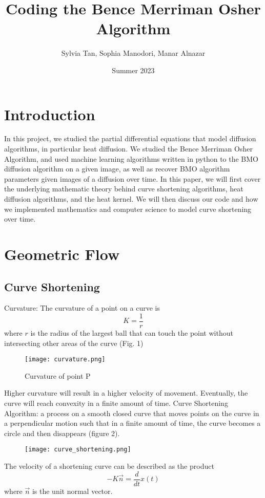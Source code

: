 \documentclass[12pt]{article}
\theoremstyle{plain}
\theoremstyle{definition}
\theoremstyle{remark}
\begin{document}
\title{Coding the Bence Merriman Osher Algorithm}
\author{Sylvia Tan, Sophia Manodori, Manar Alnazar}
\date{Summer 2023} %

\maketitle
\tableofcontents
\section{Introduction}
In this project, we studied the partial differential equations that model diffusion algorithms, in particular heat diffusion. We studied the Bence Merriman Osher Algorithm, and used machine learning algorithms written in python to the BMO diffusion algorithm on a given image, as well as recover BMO algorithm parameters given images of a diffusion over time. In this paper, we will first cover the underlying mathematic theory behind curve shortening algorithms, heat diffusion algorithms, and the heat kernel. We will then discuss our code and how we implemented mathematics and computer science to model curve shortening over time. 
 \section{Geometric Flow}
 \subsection{Curve Shortening}
  Curvature: The curvature of a point on a curve is $$K=\frac{1}{r}$$ where $r$ is the radius of the largest ball that can touch the point without intersecting other areas of the curve (Fig. 1)\\
 \begin{figure}[ht]
\caption{Curvature of point P}
\centering
\texttt{[image: curvature.png]}

\end{figure}


Higher curvature will result in a higher velocity of movement. Eventually, the curve will reach convexity in a finite amount of time. 
 Curve Shortening Algorithm: a process on a smooth closed curve that moves points on the curve in a perpendicular motion such that in a finite amount of time, the curve becomes a circle and then disappears (figure 2).
 \begin{figure}[ht]
\centering
\caption{}
\texttt{[image: curve\_shortening.png]}

\end{figure}
The velocity of a shortening curve can be described as the product $$-K\vec{n} = \frac{d}{dt} x(t)$$
where $\vec{n}$ is the unit normal vector. 
\end{document}
